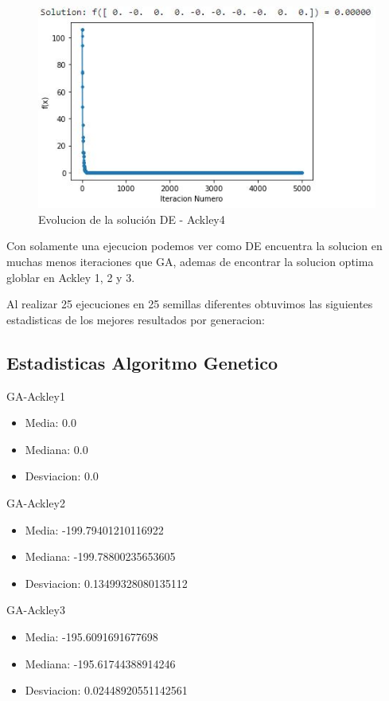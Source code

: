 \documentclass[10pt]{article}
\begin{document}
\begin{figure}[H]
\centerline{\includegraphics{ack-4-de.jpg}}
\caption{Evolucion de la solución DE - Ackley4}
\label{fig_1}
\end{figure}

Con solamente una ejecucion podemos ver como DE encuentra la solucion en muchas menos iteraciones que GA, ademas de encontrar la solucion optima globlar en Ackley 1, 2 y 3.

Al realizar 25 ejecuciones en 25 semillas diferentes obtuvimos las siguientes estadisticas de los mejores resultados por generacion: 

\subsection{Estadisticas Algoritmo Genetico}
GA-Ackley1
\begin{itemize}
\item
Media:  0.0 
\item%
Mediana:  0.0 
\item%
Desviacion:  0.0
\end{itemize}

GA-Ackley2
\begin{itemize}
\item
Media:  -199.79401210116922 
\item%
Mediana:  -199.78800235653605 
\item%
Desviacion:  0.13499328080135112
\end{itemize}

GA-Ackley3
\begin{itemize}
\item
Media:  -195.6091691677698 
\item%
Mediana:  -195.61744388914246 
\item%
Desviacion:  0.02448920551142561
\end{itemize}
\end{document}
